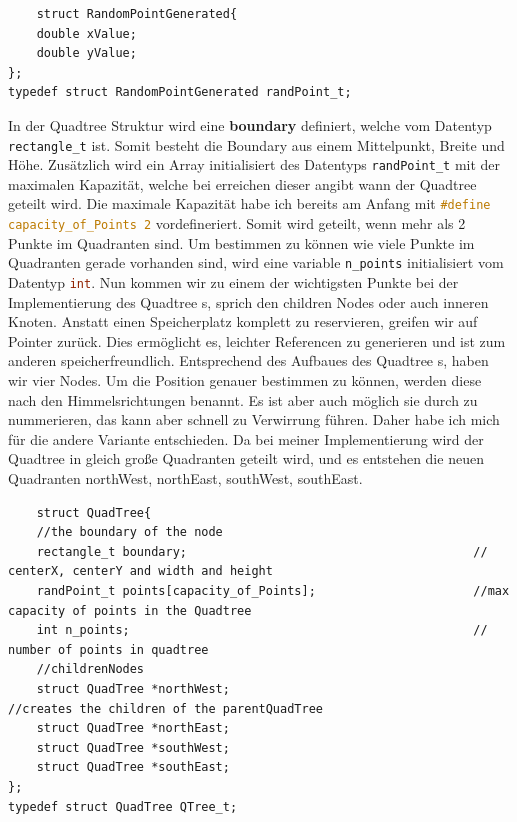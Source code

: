 \documentclass[11pt]{article}
\newcommand{\qt}{Quadtree }
\newcommand{\nw}{northWest}
\newcommand{\noea}{northEast}
\newcommand{\sw}{southWest}
\newcommand{\se}{southEast}
\newcommand{\fett}[1]{{\bf #1}}
\newcommand{\lstin}[1]{\lstinline[language=C]{#1}}
\begin{document}
\begin{lstlisting}
    struct RandomPointGenerated{
    double xValue; 
    double yValue; 
};
typedef struct RandomPointGenerated randPoint_t;
\end{lstlisting}
In der Quadtree Struktur wird eine \fett{boundary} definiert, welche vom Datentyp \lstin{rectangle_t} ist. Somit besteht die Boundary aus einem Mittelpunkt, Breite und Höhe. Zusätzlich wird ein Array initialisiert des Datentyps \lstin{randPoint_t} mit der maximalen Kapazität, welche bei erreichen dieser angibt wann der Quadtree geteilt wird. 
Die maximale Kapazität habe ich bereits am Anfang mit \lstin{#define capacity_of_Points 2} vordefineriert. Somit wird geteilt, wenn mehr als 2 Punkte im Quadranten sind. Um bestimmen zu können wie viele Punkte im Quadranten gerade vorhanden sind, wird eine variable \lstin{n_points} initialisiert vom Datentyp \lstin{int}.
Nun kommen wir zu einem der wichtigsten Punkte bei der Implementierung des \qt s, sprich den children Nodes oder auch inneren Knoten. \newline
Anstatt einen Speicherplatz komplett zu reservieren, greifen wir auf Pointer zurück. Dies ermöglicht es, leichter Referencen zu generieren und ist zum anderen speicherfreundlich. Entsprechend des Aufbaues des \qt s, haben wir vier Nodes. Um die Position genauer bestimmen zu können, werden diese nach den Himmelsrichtungen benannt. Es ist aber auch möglich sie durch zu nummerieren, das kann aber schnell zu Verwirrung führen. 
Daher habe ich mich für die andere Variante entschieden.\newline
Da bei meiner Implementierung wird der \qt in gleich große Quadranten geteilt wird, und es entstehen die neuen Quadranten \nw , \noea , \sw , \se. 

\begin{lstlisting}  
    struct QuadTree{
    //the boundary of the node
    rectangle_t boundary;                                        // centerX, centerY and width and height 
    randPoint_t points[capacity_of_Points];                      //max capacity of points in the Quadtree
    int n_points;                                                // number of points in quadtree
    //childrenNodes
    struct QuadTree *northWest;                                 //creates the children of the parentQuadTree 
    struct QuadTree *northEast; 
    struct QuadTree *southWest; 
    struct QuadTree *southEast; 
};
typedef struct QuadTree QTree_t; 
\end{lstlisting}
\end{document}
